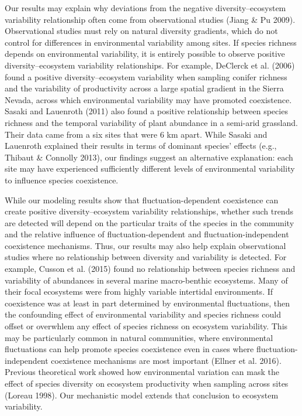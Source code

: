 \documentclass[12pt,]{article}
\begin{document}
Our results may explain why deviations from the negative
diversity--ecosystem variability relationship often come from
observational studies (Jiang \& Pu 2009). Observational studies must
rely on natural diversity gradients, which do not control for
differences in environmental variability among sites. If species
richness depends on environmental variability, it is entirely possible
to observe positive diversity--ecosystem variability relationships. For
example, DeClerck et al. (2006) found a positive diversity--ecosystem
variability when sampling conifer richness and the variability of
productivity across a large spatial gradient in the Sierra Nevada,
across which environmental variability may have promoted coexistence.
Sasaki and Lauenroth (2011) also found a positive relationship between
species richness and the temporal variability of plant abundance in a
semi-arid grassland. Their data came from a six sites that were 6 km
apart. While Sasaki and Lauenroth explained their results in terms of
dominant species' effects (e.g., Thibaut \& Connolly 2013), our findings
suggest an alternative explanation: each site may have experienced
sufficiently different levels of environmental variability to influence
species coexistence.

While our modeling results show that fluctuation-dependent coexistence
can create positive diversity--ecosystem variability relationships,
whether such trends are detected will depend on the particular traits of
the species in the community and the relative influence of
fluctuation-dependent and fluctuation-independent coexistence
mechanisms. Thus, our results may also help explain observational
studies where no relationship between diversity and variability is
detected. For example, Cusson et al. (2015) found no relationship
between species richness and variability of abundances in several marine
macro-benthic ecosystems. Many of their focal ecosystems were from
highly variable intertidal environments. If coexistence was at least in
part determined by environmental fluctuations, then the confounding
effect of environmental variability and species richness could offset or
overwhlem any effect of species richness on ecosystem variability. This
may be particularly common in natural communities, where environmental
fluctuations can help promote species coexistence even in cases where
fluctuation-independent coexistence mechanisms are most important
(Ellner et al. 2016). Previous theoretical work showed how environmental
variation can mask the effect of species diversity on ecosystem
productivity when sampling across sites (Loreau 1998). Our mechanistic
model extends that conclusion to ecosystem variability.
\end{document}
